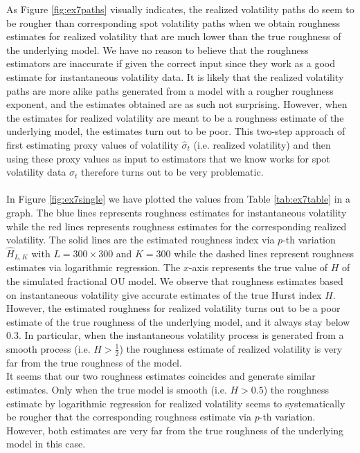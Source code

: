 \documentclass{article}
\begin{document}
As Figure \ref{fig:ex7paths} visually indicates, the realized volatility paths do seem to be rougher than corresponding spot volatility paths when we obtain roughness estimates for realized volatility that are much lower than the true roughness of the underlying model. We have no reason to believe that the roughness estimators are inaccurate if given the correct input since they work as a good estimate for instantaneous volatility data. It is likely that the realized volatility paths are more alike paths generated from a model with a rougher roughness exponent, and the estimates obtained are as such not surprising. However, when the estimates for realized volatility are meant to be a roughness estimate of the underlying model, the estimates turn out to be poor. This two-step approach of first estimating proxy values of volatility $\hat{\sigma}_t$ (i.e. realized volatility) and then using these proxy values as input to estimators that we know works for spot volatility data $\sigma_t$ therefore turns out to be very problematic. \\\\
In Figure \ref{fig:ex7single} we have plotted the values from Table \ref{tab:ex7table} in a graph. The blue lines represents roughness estimates for instantaneous volatility while the red lines represents roughness estimates for the corresponding realized volatility. The solid lines are the estimated roughness index via $p$-th variation $\widehat{H}_{L,K}$ with $L=300\times 300$ and $K=300$ while the dashed lines represent roughness estimates via logarithmic regression. The $x$-axis represents the true value of $H$ of the simulated fractional OU model. We observe that roughness estimates based on instantaneous volatility give accurate estimates of the true Hurst index $H$. However, the estimated roughness for realized volatility turns out to be a poor estimate of the true roughness of the underlying model, and it always stay below $0.3$. In particular, when the instantaneous volatility process is generated from a smooth process (i.e. $H>\frac{1}{2}$) the roughness estimate of realized volatility is very far from the true roughness of the model.\\ 
It seems that our two roughness estimates coincides and generate similar estimates. Only when the true model is smooth (i.e. $H>0.5$) the roughness estimate by logarithmic regression for realized volatility seems to systematically be rougher that the corresponding roughness estimate via $p$-th variation. However, both estimates are very far from the true roughness of the underlying model in this case. 
\end{document}
